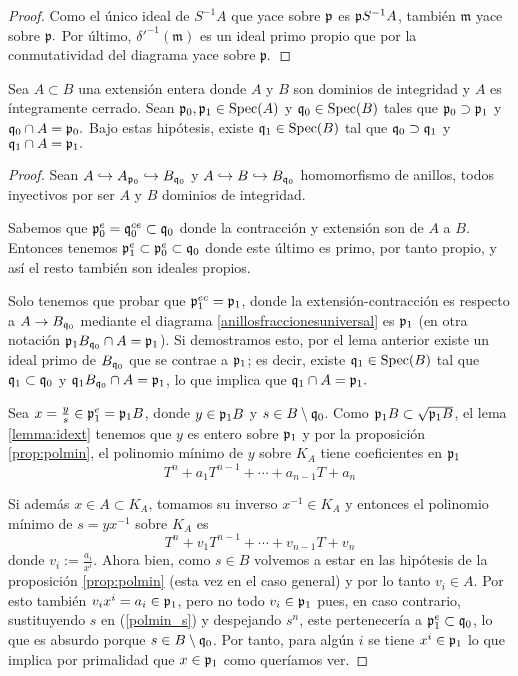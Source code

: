 \documentclass[../main.tex]{subfiles}
\begin{document}
\begin{proof}
Como el único ideal de $S^{-1}A$ que yace sobre $\mathfrak{p}$ es $\mathfrak{p} S^{-1}A$, también $\mathfrak{m}$ yace sobre $\mathfrak{p}.$ Por último, $\delta'^{-1}(\mathfrak{m})$ es un ideal primo propio que por la conmutatividad del diagrama yace sobre $\mathfrak{p}.$
\end{proof}

\begin{theorem} Sea $A\subset B$ una extensión entera donde $A$ y $B$ son dominios de integridad y $A$ es íntegramente cerrado. Sean $\mathfrak{p}_0,\mathfrak{p}_1\in\text{Spec}(A)$ y $\mathfrak{q}_0\in\text{Spec}(B)$ tales que $\mathfrak{p}_0\supset\mathfrak{p}_1$ y $\mathfrak{q}_0\cap A=\mathfrak{p}_0.$ Bajo estas hipótesis, existe $\mathfrak{q}_1\in\text{Spec}(B)$ tal que $\mathfrak{q}_0\supset\mathfrak{q}_1$ y $\mathfrak{q}_1\cap A=\mathfrak{p}_1.$
\end{theorem}

\begin{proof}
Sean $A\hookrightarrow A_{\mathfrak{p}_0}\hookrightarrow B_{\mathfrak{q}_0}$ y $A\hookrightarrow B\hookrightarrow B_{\mathfrak{q}_0}$ homomorfismo de anillos, todos inyectivos por ser $A$ y $B$ dominios de integridad.

Sabemos que $\mathfrak{p}_0^e=\mathfrak{q}_0^{ce}\subset\mathfrak{q}_0$ donde la contracción y extensión son de $A$ a $B$. Entonces tenemos $\mathfrak{p}_1^e\subset\mathfrak{p}_0^e\subset\mathfrak{q}_0$ donde este último es primo, por tanto propio, y así el resto también son ideales propios.

Solo tenemos que probar que $\mathfrak{p}_1^{ec} = \mathfrak{p}_1$, donde la extensión-contracción es respecto a $A\to B_{\mathfrak{q}_0}$ mediante el diagrama \ref{anillosfraccionesuniversal} es $\mathfrak{p}_1$ (en otra notación $\mathfrak{p}_1 B_{\mathfrak{q}_0}\cap A=\mathfrak{p}_1$).
Si demostramos esto, por el lema anterior existe un ideal primo de $B_{\mathfrak{q}_0}$ que se contrae a $\mathfrak{p}_1$; es decir, existe $\mathfrak{q}_1\in\text{Spec}(B)$ tal que $\mathfrak{q}_1\subset\mathfrak{q}_0$ y $\mathfrak{q}_1B_{\mathfrak{q}_0}\cap A=\mathfrak{p}_1$, lo que implica que $\mathfrak{q}_1\cap A=\mathfrak{p}_1.$

Sea $x=\frac{y}{s}\in \mathfrak{p}_1^{e}= \mathfrak{p}_1B$, donde $y\in\mathfrak{p}_1 B$ y $s\in B\setminus\mathfrak{q}_0$. Como $\mathfrak{p}_1B \subset \sqrt{\mathfrak{p}_1B}$, el lema \ref{lemma:idext} tenemos que $y$ es entero sobre $\mathfrak{p}_1$ y por la proposición \ref{prop:polmin}, el polinomio mínimo de $y$ sobre $K_A$ tiene coeficientes en $\mathfrak{p}_1$
\begin{equation}\label{polmin_s}
  T^n+a_1T^{n-1}+\cdots+a_{n-1}T+a_n
\end{equation}

Si además $x\in A \subset K_A$, tomamos su inverso $x^{-1}\in K_A$ y entonces el polinomio mínimo de $s=yx^{-1}$ sobre $K_A$ es
$$T^n+v_1T^{n-1}+\cdots+v_{n-1}T+v_n$$
donde $v_i:=\frac{a_i}{x^i}$. Ahora bien, como $s\in B$ volvemos a estar en las hipótesis de la proposición \ref{prop:polmin} (esta vez en el caso general) y por lo tanto $v_i\in A.$ Por esto también $v_i x^i=a_i\in\mathfrak{p}_1$, pero no todo $v_i\in\mathfrak{p}_1$ pues, en caso contrario, sustituyendo $s$ en (\ref{polmin_s}) y despejando $s^n$, este pertenecería a $\mathfrak{p}_1^e\subset \mathfrak{q}_0$, lo que es absurdo porque $s\in B\setminus \mathfrak{q}_0$.
Por tanto, para algún $i$ se tiene $x^i\in\mathfrak{p}_1$ lo que implica por primalidad que $x\in \mathfrak{p}_1$ como queríamos ver.
\end{proof}
\end{document}

